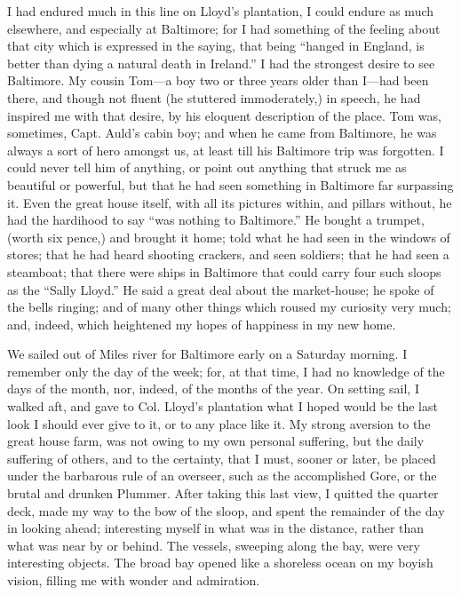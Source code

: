 I had endured much in this line on Lloyd's plantation, I could endure as
much elsewhere, and especially at Baltimore; for I had something of the
feeling about that city which is expressed in the saying, that being
``hanged in England, is better than dying a natural death in Ireland.''
I had the strongest desire to see Baltimore. My cousin Tom---a boy two
or three years older than I---had been there, and though not fluent (he
stuttered immoderately,) in speech, he had inspired me with that desire,
by his {}eloquent description of the place. Tom was, sometimes, Capt.
Auld's cabin boy; and when he came from Baltimore, he was always a sort
of hero amongst us, at least till his Baltimore trip was forgotten. I
could never tell him of anything, or point out anything that struck me
as beautiful or powerful, but that he had seen something in Baltimore
far surpassing it. Even the great house itself, with all its pictures
within, and pillars without, he had the hardihood to say ``was nothing
to Baltimore.'' He bought a trumpet, (worth six pence,) and brought it
home; told what he had seen in the windows of stores; that he had heard
shooting crackers, and seen soldiers; that he had seen a steamboat; that
there were ships in Baltimore that could carry four such sloops as the
``Sally Lloyd.'' He said a great deal about the market-house; he spoke
of the bells ringing; and of many other things which roused my curiosity
very much; and, indeed, which heightened my hopes of happiness in my new
home.

We sailed out of Miles river for Baltimore early on a Saturday morning.
I remember only the day of the week; for, at that time, I had no
knowledge of the days of the month, nor, indeed, of the months of the
year. On setting sail, I walked aft, and gave to Col. Lloyd's plantation
what I hoped would be the last look I should ever give to it, or to any
place like it. My strong aversion to the great house farm, was not owing
to my own personal suffering, but the daily suffering of others, and to
the certainty, that I must, sooner or later, be placed under the
barbarous rule of an overseer, such as the accomplished Gore, or the
{}brutal and drunken Plummer. After taking this last view, I quitted the
quarter deck, made my way to the bow of the sloop, and spent the
remainder of the day in looking ahead; interesting myself in what was in
the distance, rather than what was near by or behind. The vessels,
sweeping along the bay, were very interesting objects. The broad bay
opened like a shoreless ocean on my boyish vision, filling me with
wonder and admiration.

